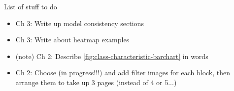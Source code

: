 
List of stuff to do

\begin{itemize}

\item Ch 3: Write up model consistency sections
\item Ch 3: Write about heatmap examples

\item (\fix note) Ch 2: Describe \autoref{fig:class-characteristic-barchart} in words 
\item Ch 2: Choose (in progress!!!) and add filter images for each block, then arrange them to take up 3 pages (instead of 4 or 5...)

\end{itemize}
